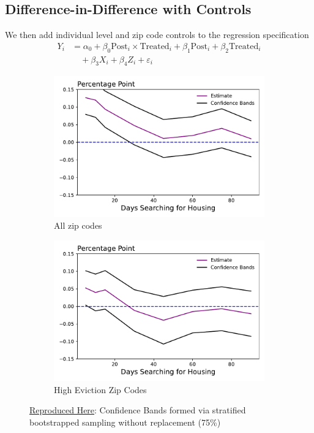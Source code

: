 \documentclass[a4paper,12pt]{article}
\begin{document}
\subsection{Difference-in-Difference with Controls}
We then add individual level and zip code controls to the regression specification
\begin{align*}
    Y_i &= \alpha _0 + \beta_0 \textrm{Post}_i \times \textrm{Treated}_i + \beta_1  \textrm{Post}_i + \beta_2 \textrm{Treated}_i \\ 
    &\quad + \beta _3X_i + \beta_4 Z_i + \varepsilon_i
\end{align*}
\begin{figure}[htbp]
\centering
\begin{subfigure}{.48\textwidth}
    \centering
    \includegraphics[width=.95\linewidth]{figures/rtc/results/cceh/linear_reg_False.pdf}
    \caption{All zip codes}
    \label{SUBFIGURE LABEL 3}
\end{subfigure}
\begin{subfigure}{.48\textwidth}
    \centering
    \includegraphics[width=.95\linewidth]{figures/rtc/results/cceh/linear_reg_True.pdf}
    \caption{High Eviction Zip Codes}
    \label{SUBFIGURE LABEL 4}
\end{subfigure}
\caption{ \href{https://github.com/pharringtonp19/evictions/blob/main/scripts/cceh/primary/diff_n_mean_rrh.py}{Reproduced Here}: Confidence Bands formed via stratified bootstrapped sampling without replacement (75\%)}
\label{FIGURE LABEL}
\end{figure}
\end{document}
